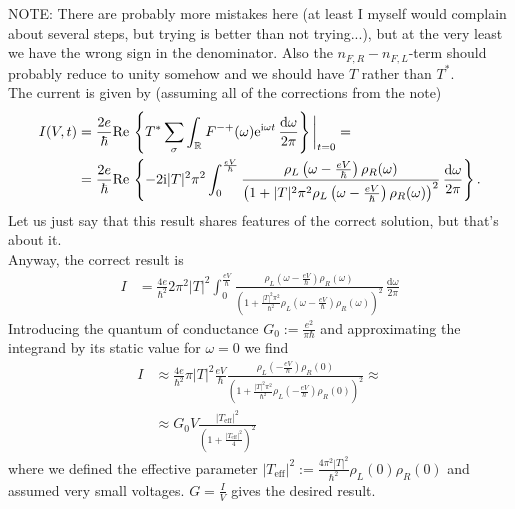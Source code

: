\documentclass[english, parskip=full]{scrartcl}
\newcommand{\intx}{}
\newcommand{\intr}{}
\newcommand{\kla}{}
\newcommand{\klammer}{}
\newcommand{\tecxt}{}
\renewcommand{\i}{\text{i}}
\newcommand{\e}{\text{e}}
\begin{document}
NOTE: There are probably more mistakes here (at least I myself would complain about several steps, but trying is better than not trying...), but at the very least we have the wrong sign in the denominator.
Also the $n_{F,R} - n_{F,L}$-term should probably reduce to unity somehow and we should have $T$ rather than $T^\ast$.\\
The current is given by (assuming all of the corrections from the note)
\begin{align}
I(V,t) &= \frac{2e}{\hbar} \tecxt\text{Re\,} \klammer\left\{ T^\ast \sum_\sigma \intr\int_{\mathbb{R}^{ }} F^{-+}(\omega) \e^{\i \omega t} \, \frac{\mathrm{d}\omega}{2\pi} \right\} \bigg\vert_{t=0} = \\
&= \frac{2e}{\hbar} \tecxt\text{Re\,} \klammer\left\{ -2\i |T|^2\pi^2 \intx\int_{0}^{\frac{eV}{\hbar}} \frac{\rho_L\left( \omega - \frac{eV}{\hbar} \right) \rho_R(\omega)}{\left( 1 + |T|^2 \pi^2 \rho_L\left( \omega - \frac{eV}{\hbar} \right) \rho_R(\omega) \right)^2} \, \frac{\mathrm{d}\omega}{2\pi} \right\}.
\end{align}
Let us just say that this result shares features of the correct solution, but that's about it.\\
Anyway, the correct result is
\begin{align}
I &= \frac{4e}{\hbar^2} 2\pi^2 |T|^2 \intx\int_{0}^{\frac{eV}{\hbar}}  \frac{\rho_L\left( \omega - \frac{eV}{\hbar} \right) \rho_R(\omega)}{\left( 1 + \frac{|T|^2 \pi^2}{\hbar^2} \rho_L\left( \omega - \frac{eV}{\hbar} \right) \rho_R(\omega) \right)^2} \, \frac{\mathrm{d}\omega}{2\pi}
\end{align}
Introducing the quantum of conductance $G_0 := \frac{e^2}{\pi\hbar}$ and approximating the integrand by its static value for $\omega=0$ we find
\begin{align}
I &\approx \frac{4e}{\hbar^2} \pi |T|^2 \frac{eV}{\hbar} \frac{\rho_L\kla\left( -\frac{eV}{\hbar} \right) \rho_R(0)}{ \left( 1 + \frac{|T|^2 \pi^2}{\hbar^2} \rho_L\left( - \frac{eV}{\hbar} \right) \rho_R(0) \right)^2 } \approx \\
&\approx  G_0 V \frac{|T_\tecxt\text{eff}|^2}{\kla\left( 1 + \frac{|T_\tecxt\text{eff}|^2}{4} \right)^2}
\end{align}
where we defined the effective parameter $|T_\tecxt\text{eff}|^2 := \frac{4\pi^2 |T|^2}{\hbar^2} \rho_L(0)\rho_R(0)$ and assumed very small voltages.
$G = \frac{I}{V}$ gives the desired result.

\end{document}
